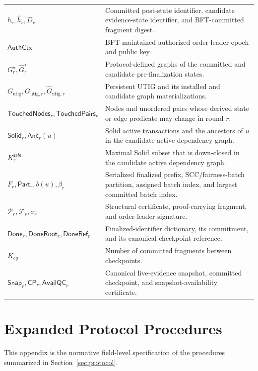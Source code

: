 \begin{table}[t]
\begin{tabular}{p{}p{}}
$h_r,\widehat h_r,D_r$ & Committed post-state identifier, candidate evidence-state identifier, and BFT-committed fragment digest. \\
$\mathsf{AuthCtx}$ & BFT-maintained authorized order-leader epoch and public key. \\
$G_r^\star,\widehat G_r^\star$ & Protocol-defined graphs of the committed and candidate pre-finalization states. \\
$G_{\mathrm{utig}},G_{\mathrm{utig},r},\widehat G_{\mathrm{utig},r}$ & Persistent UTIG and its installed and candidate graph materializations. \\
$\mathsf{TouchedNodes}_r,\mathsf{TouchedPairs}_r$ & Nodes and unordered pairs whose derived state or edge predicate may change in round $r$. \\
$\mathsf{Solid}_r,\mathsf{Anc}_r(u)$ & Solid active transactions and the ancestors of $u$ in the candidate active dependency graph. \\
$K_r^{\mathsf{safe}}$ & Maximal Solid subset that is down-closed in the candidate active dependency graph. \\
$F_r,\mathsf{Part}_r,b(u),\beta_r$ & Serialized finalized prefix, SCC/fairness-batch partition, assigned batch index, and largest committed batch index. \\
$\mathcal P_r,\mathcal F_r,\sigma_r^{\mathsf L}$ & Structural certificate, proof-carrying fragment, and order-leader signature. \\
$\mathsf{Done}_r,\mathsf{DoneRoot}_r,\mathsf{DoneRef}_r$ & Finalized-identifier dictionary, its commitment, and its canonical checkpoint reference. \\
$K_{\mathrm{cp}}$ & Number of committed fragments between checkpoints. \\
$\mathsf{Snap}_r,\mathsf{CP}_r,\mathsf{AvailQC}_r$ & Canonical live-evidence snapshot, committed checkpoint, and snapshot-availability certificate. \\
\hline
\end{tabular}
\end{table}

\section{Expanded Protocol Procedures}
\label{app:expanded-protocol}

This appendix is the normative field-level specification of the procedures
summarized in Section~\ref{sec:protocol}.

